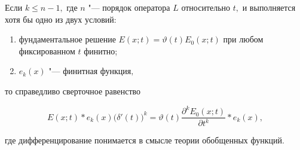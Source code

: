 \begin{lemma}Если $k\le n-1,$ где $n$ "--- порядок оператора $L$ относительно $t,$ и выполняется хотя бы одно из двух условий{\/\rm:} 

\begin{enumerate}

\item[\rm 1)] фундаментальное решение $E(x;t)=\vartheta (t)E_0 (x;t)$ при любом фиксированном $t$ финитно{\rm;}

\item[\rm 2)] $e_k (x)$ "--- финитная функция$,$

\end{enumerate}

то справедливо сверточное равенство

\begin{equation}

\label{kogan:eq11}

E(x;t)\ast e_k (x)\big(\delta'(t)\big)^k=\vartheta (t)\frac{\partial^kE_0 (x;t)}{\partial t^k}\ast e_k (x),

\end{equation}

где дифференцирование понимается в смысле теории обобщенных функций\rm.

\end{lemma}





\smallskip



